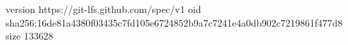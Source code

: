version https://git-lfs.github.com/spec/v1
oid sha256:16de81a4380f03435c7fd105e6724852b9a7c7241e4a0db902c7219861f477d8
size 133628
